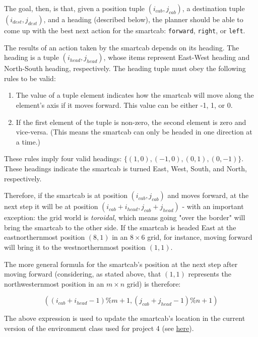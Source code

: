 \documentclass{article}
\begin{document}
The goal, then, is that, given a position tuple $(i_{cab}, j_{cab})$, a destination tuple $(i_{dest}, j_{dest})$, and a heading (described below), the planner should be able to come up with the best next action for the smartcab: \texttt{forward}, \texttt{right}, or \texttt{left}. 

The results of an action taken by the smartcab depends on its heading. The heading is a tuple $(i_{head}, j_{head})$, whose items represent East-West heading and North-South heading, respectively. The heading tuple must obey the following rules to be valid:

\begin{enumerate}
   \item The value of a tuple element indicates how the smartcab will move along the element's axis if it moves forward. This value can be either -1, 1, or 0.
   \item If the first element of the tuple is non-zero, the second element is zero and vice-versa. (This means the smartcab can only be headed in one direction at a time.)
\end{enumerate}

These rules imply four valid headings: $\{(1, 0), (-1, 0), (0, 1), (0, -1)\}$. These headings indicate the smartcab is turned East, West, South, and North, respectively.
 
Therefore, if the smartcab is at position $(i_{cab}, j_{cab})$ and moves forward, at the next step it will be at position $(i_{cab} + i_{head}, j_{cab} + j_{head})$ - with an important exception: the grid world is \textit{toroidal}, which means going "over the border" will bring the smartcab to the other side. If the smartcab is headed East at the eastnorthernmost position $(8, 1)$ in an $8\times6$ grid, for instance, moving forward will bring it to the westnorthernmost position $(1, 1)$. 

The more general formula for the smartcab's position at the next step after moving forward (considering, as stated above, that $(1, 1)$ represents the northwesternmost position in an $m\times n$ grid) is therefore:

\begin{equation}
((i_{cab} + i_{head} - 1) \% m + 1, (j_{cab} + j_{head} - 1) \% n + 1)
\end{equation}

The above expression is used to update the smartcab's location in the current version of the environment class used for project 4 (see \href{https://github.com/udacity/machine-learning/blob/2b6a7fca8ea43e00519f426a6b4ad3a130fca737/projects/smartcab/smartcab/environment.py#L195-L19}{here}).
\end{document}
